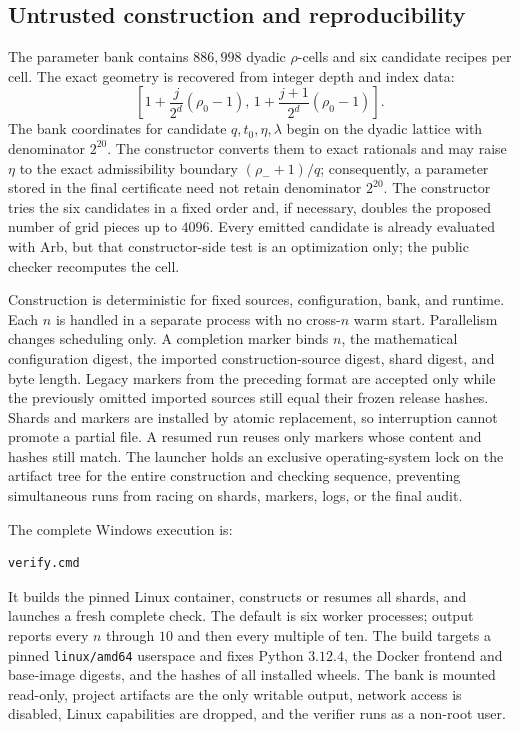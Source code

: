 \documentclass[11pt,a4paper,twoside]{article}
\theoremstyle{remark}
\newcommand{\rhozero}{\rho_{0}}
\newcommand{\code}[1]{\texttt{#1}}
\begin{document}
\subsection{Untrusted construction and reproducibility}

The parameter bank contains \(886{,}998\) dyadic \(\rho\)-cells and six
candidate recipes per cell.  The exact geometry is recovered from integer
depth and index data:
\[
 \left[
 1+\frac{j}{2^d}(\rhozero-1),
 \,
 1+\frac{j+1}{2^d}(\rhozero-1)
 \right].
\]
The bank coordinates for candidate \(q,t_0,\eta,\lambda\) begin on the
dyadic lattice with denominator \(2^{20}\).  The constructor converts them to
exact rationals and may raise \(\eta\) to the exact admissibility boundary
\((\rho_-+1)/q\); consequently, a parameter stored in the final certificate
need not retain denominator \(2^{20}\).  The constructor tries the six
candidates in a fixed order and, if necessary, doubles the proposed number of
grid pieces up to \(4096\).  Every emitted candidate is already evaluated with
Arb, but that constructor-side test is an optimization only; the public checker
recomputes the cell.

Construction is deterministic for fixed sources, configuration, bank, and
runtime.  Each \(n\) is handled in a separate process with no cross-\(n\)
warm start.  Parallelism changes scheduling only.  A completion marker binds
\(n\), the mathematical configuration digest, the imported construction-source
digest, shard digest, and byte length.  Legacy markers from the preceding
format are accepted only while the previously omitted imported sources still
equal their frozen release hashes.  Shards and markers are installed by
atomic replacement, so interruption cannot promote a partial file.  A resumed
run reuses only markers whose content and hashes still match.
The launcher holds an exclusive operating-system lock on the artifact tree for
the entire construction and checking sequence, preventing simultaneous runs
from racing on shards, markers, logs, or the final audit.

The complete Windows execution is:
\begin{lstlisting}[language=bash]
verify.cmd
\end{lstlisting}
It builds the pinned Linux container, constructs or resumes all shards, and
launches a fresh complete check.  The default is six worker processes; output
reports every \(n\) through \(10\) and then every multiple of ten.  The
build targets a pinned \code{linux/amd64} userspace and fixes
Python \(3.12.4\), the Docker frontend and base-image digests, and the hashes
of all installed wheels.  The bank is
mounted read-only, project artifacts are the only writable output, network
access is disabled, Linux capabilities are dropped, and the verifier runs as
a non-root user.
\end{document}
